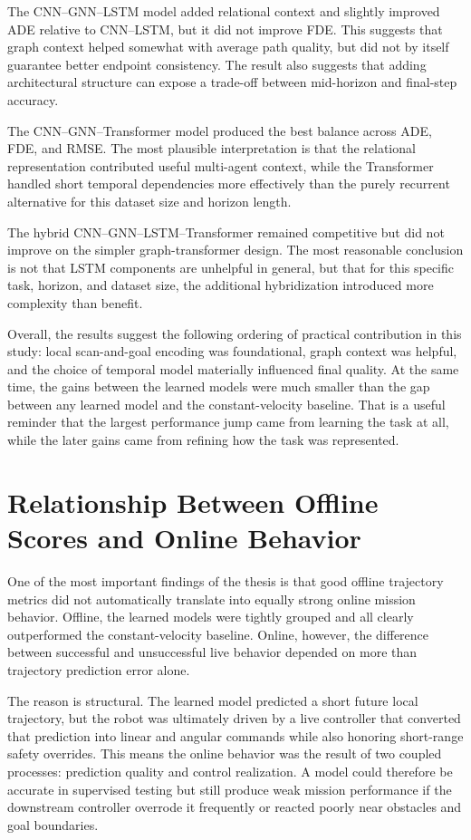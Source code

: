 The CNN--GNN--LSTM model added relational context and slightly improved ADE relative to CNN--LSTM, but it did not improve FDE. This suggests that graph context helped somewhat with average path quality, but did not by itself guarantee better endpoint consistency. The result also suggests that adding architectural structure can expose a trade-off between mid-horizon and final-step accuracy.

The CNN--GNN--Transformer model produced the best balance across ADE, FDE, and RMSE. The most plausible interpretation is that the relational representation contributed useful multi-agent context, while the Transformer handled short temporal dependencies more effectively than the purely recurrent alternative for this dataset size and horizon length.

The hybrid CNN--GNN--LSTM--Transformer remained competitive but did not improve on the simpler graph-transformer design. The most reasonable conclusion is not that LSTM components are unhelpful in general, but that for this specific task, horizon, and dataset size, the additional hybridization introduced more complexity than benefit.

Overall, the results suggest the following ordering of practical contribution in this study: local scan-and-goal encoding was foundational, graph context was helpful, and the choice of temporal model materially influenced final quality. At the same time, the gains between the learned models were much smaller than the gap between any learned model and the constant-velocity baseline. That is a useful reminder that the largest performance jump came from learning the task at all, while the later gains came from refining how the task was represented.

\section{Relationship Between Offline Scores and Online Behavior}

One of the most important findings of the thesis is that good offline trajectory metrics did not automatically translate into equally strong online mission behavior. Offline, the learned models were tightly grouped and all clearly outperformed the constant-velocity baseline. Online, however, the difference between successful and unsuccessful live behavior depended on more than trajectory prediction error alone.

The reason is structural. The learned model predicted a short future local trajectory, but the robot was ultimately driven by a live controller that converted that prediction into linear and angular commands while also honoring short-range safety overrides. This means the online behavior was the result of two coupled processes: prediction quality and control realization. A model could therefore be accurate in supervised testing but still produce weak mission performance if the downstream controller overrode it frequently or reacted poorly near obstacles and goal boundaries.

